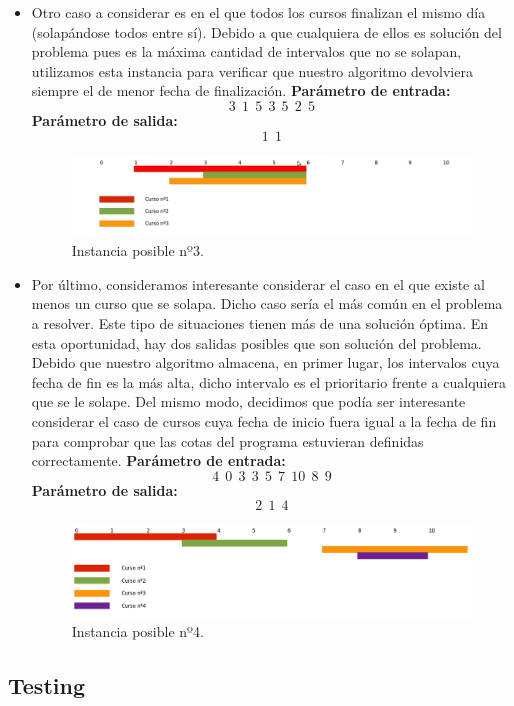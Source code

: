 \begin{itemize}
\item Otro caso a considerar es en el que todos los cursos finalizan el mismo día (solapándose todos entre sí). Debido a que cualquiera de ellos es solución del problema pues es la máxima cantidad de intervalos que no se solapan, utilizamos esta instancia para verificar que nuestro algoritmo devolviera siempre el de menor fecha de finalización. \newline
\textbf{Parámetro de entrada:}  $$3\ \ 1\ \ 5\ \ 3\ \ 5\ \ 2\ \ 5$$
\textbf{Parámetro de salida:}  $$1\ \ 1$$\newline

\begin{figure}[H] %
\begin{center}
\includegraphics[width=450pt]{../imgs/instancia3.jpg}
\end{center}
\caption{Instancia posible nº3.}
\end{figure}


\item Por último, consideramos interesante considerar el caso en el que existe al menos un curso que se solapa. Dicho caso sería el más común en el problema a resolver. Este tipo de situaciones tienen más de una solución óptima. En esta oportunidad, hay dos salidas posibles que son solución del problema. Debido que nuestro algoritmo almacena, en primer lugar, los intervalos cuya fecha de fin es la más alta, dicho intervalo es el prioritario frente a cualquiera que se le solape. Del mismo modo, decidimos que podía ser interesante considerar el caso de cursos cuya fecha de inicio fuera igual a la fecha de fin para comprobar que las cotas del programa estuvieran definidas correctamente.\newline
\textbf{Parámetro de entrada:}  $$4\ \ 0\ \ 3\ \ 3\ \ 5\ \ 7\ \ 10\ \ 8\ \ 9$$
\textbf{Parámetro de salida:}  $$2\ \ 1\ \ 4$$ \newline

\begin{figure}[H] %
\begin{center}
\includegraphics[width=450pt]{../imgs/instancia1.jpg}
\end{center}
\caption{Instancia posible nº4.}
\end{figure}

\end{itemize}

\subsection{Testing}
